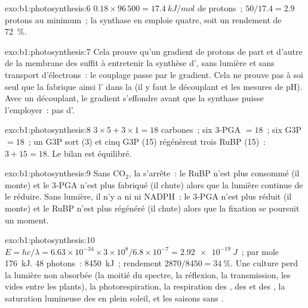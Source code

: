 \begin{solution}{exo:b1:photosynthesis:6}
$0.18\times 96\,500 = \qty{17.4}{kJ/mol}$ de protons~; $50/17.4 = 2.9$
protons au minimum~; la synthase en emploie quatre, soit un rendement de
\qty{72}{\%}.
\end{solution}

\begin{solution}{exo:b1:photosynthesis:7}
Cela prouve qu'un gradient de protons de part et d'autre de la membrane
des  suffit à entretenir la synthèse d', sans lumière et
sans transport d'électrons~: le couplage passe par le gradient. Cela ne
prouve pas à soi seul que la  fabrique ainsi l'
dans la  (il y faut le découplant et les mesures de pH). Avec un
découplant, le gradient s'effondre avant que la synthase puisse
l'employer~: pas d'.
\end{solution}

\begin{solution}{exo:b1:photosynthesis:8}
$3\times 5 + 3\times 1 = 18$ carbones~; six 3-PGA $= 18$~; six G3P $= 18$~;
un G3P sort (3) et cinq G3P (15) régénèrent trois RuBP (15)~: $3 +
15 = 18$. Le bilan est équilibré.
\end{solution}

\begin{solution}{exo:b1:photosynthesis:9}
Sans $\mathrm{CO_2}$, la  s'arrête~: le RuBP n'est plus consommé
(il monte) et le 3-PGA n'est plus fabriqué (il chute) alors que la
lumière continue de le réduire. Sans lumière, il n'y a ni  ni NADPH~:
le 3-PGA n'est plus réduit (il monte) et le RuBP n'est plus régénéré (il
chute) alors que la fixation se poursuit un moment.
\end{solution}

\begin{solution}{exo:b1:photosynthesis:10}
$E = hc/\lambda = 6.63\times 10^{-34}\times 3\times 10^8/6.8\times
10^{-7} = \qty{2.92e-19}{J}$~; par mole \qty{176}{kJ}. 48 photons~:
\qty{8450}{kJ}~; rendement $2870/8450 = \qty{34}{\%}$. Une culture perd
la lumière non absorbée (la moitié du spectre, la réflexion, la
transmission, les vides entre les plants), la photorespiration, la
respiration des , des  et des , la saturation
lumineuse des  en plein soleil, et les saisons sans .
\end{solution}


